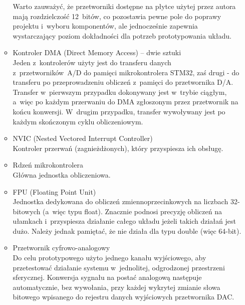 \begin{enumerate}
\begin{itemize}
		Warto zauważyć, że przetworniki dostępne na płytce użytej przez autora mają rozdzielczość 12~bitów, co pozostawia pewne pole do poprawy projektu i~wyboru komponentów, ale jednocześnie zapewnia wystarczający poziom dokładności dla potrzeb prototypowania układu.
		\item Kontroler DMA (Direct Memory Access) -- dwie sztuki\\
		Jeden z~kontrolerów użyty jest do transferu danych z~przetworników~A/D do pamięci mikrokontrolera STM32, zaś drugi - do transferu po przeprowadzeniu obliczeń z~pamięci do przetwornika D/A. Transfer w~pierwszym przypadku dokonywany jest w~trybie ciągłym, a~więc po każdym przerwaniu do DMA zgłoszonym przez przetwornik na końcu konwersji. W~drugim przypadku, transfer wywoływany jest po każdym skończonym cyklu obliczeniowym.
		\item NVIC (Nested Vectored Interrupt Controller)\\
		Kontroler przerwań (zagnieżdżonych), który przyspiesza ich obsługę.
		\item Rdzeń mikrokontrolera\\
		Główna jednostka obliczeniowa.
		\item FPU (Floating Point Unit)\\
		Jednostka dedykowana do obliczeń zmiennoprzecinkowych na liczbach 32-bitowych (a~więc typu float). Znacznie podnosi precyzję obliczeń na ułamkach i~przyspiesza działanie całego układu jeżeli takich działań jest dużo. Należy jednak pamiętać, że nie działa dla typu double (więc 64-bit). 
		\item Przetwornik cyfrowo-analogowy\\
		Do celu prototypowego użyto jednego kanału wyjściowego, aby przetestować działanie systemu w~jednolitej, odgrodzonej przestrzeni sferycznej. Konwersja sygnału na postać analogową następuje automatycznie, bez wywołania, przy każdej wykrytej zmianie słowa bitowego wpisanego do rejestru danych wyjściowych przetwornika DAC.
	\end{itemize}
\end{enumerate}

